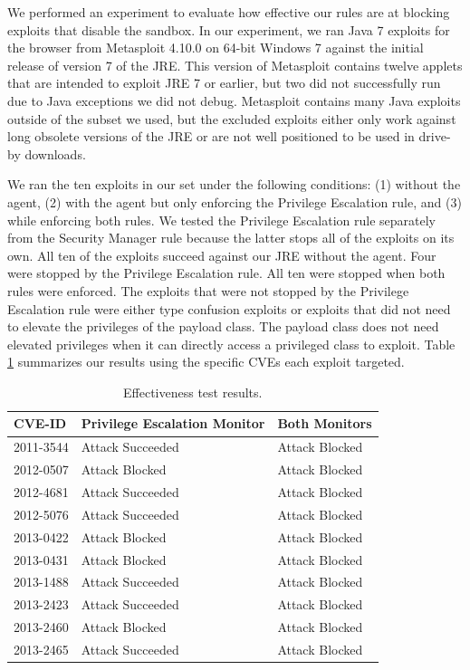\documentclass{sig-alternate}
\begin{document}

We performed an experiment to evaluate how effective our rules are
at blocking exploits that disable the sandbox. In our experiment,
we ran Java 7 exploits for the browser from Metasploit 4.10.0 on 64-bit
Windows 7 against the initial release of version 7 of the JRE. This
version of Metasploit contains twelve applets that are intended to
exploit JRE 7 or earlier, but two did not successfully run due to
Java exceptions we did not debug. Metasploit contains many Java exploits
outside of the subset we used, but the excluded exploits either only
work against long obsolete versions of the JRE or are not well positioned
to be used in drive-by downloads. 

We ran the ten exploits in our set under the following conditions:
(1) without the agent, (2) with the agent but only enforcing the Privilege
Escalation rule, and (3) while enforcing both rules. We tested the Privilege Escalation rule separately from the Security Manager rule because the latter stops all of the exploits on its own. All
ten of the exploits succeed against our JRE without the agent. Four
were stopped by the Privilege Escalation rule. All ten were stopped
when both rules were enforced. The exploits that were not stopped
by the Privilege Escalation rule were either type confusion exploits
or exploits that did not need to elevate the privileges of the payload
class. The payload class does not need elevated privileges when it
can directly access a privileged class to exploit. Table \ref{tab:Exploit-experiment-summary}
summarizes our results using the specific CVEs each exploit targeted.

\begin{table}
\caption{Effectiveness test results.}\label{tab:Exploit-experiment-summary}
\begin{tabular}{l>{\raggedright}p{3cm}l}
\toprule 
\textbf{CVE-ID} & \textbf{Privilege Escalation Monitor} & \textbf{Both Monitors}\tabularnewline
\midrule
2011-3544 & Attack Succeeded  & Attack Blocked\tabularnewline
2012-0507 & Attack Blocked & Attack Blocked\tabularnewline
2012-4681 & Attack Succeeded  & Attack Blocked\tabularnewline
2012-5076 & Attack Succeeded  & Attack Blocked\tabularnewline
2013-0422 & Attack Blocked & Attack Blocked\tabularnewline
2013-0431 & Attack Blocked & Attack Blocked\tabularnewline
2013-1488 & Attack Succeeded  & Attack Blocked\tabularnewline
2013-2423 & Attack Succeeded  & Attack Blocked\tabularnewline
2013-2460 & Attack Blocked & Attack Blocked\tabularnewline
2013-2465 & Attack Succeeded  & Attack Blocked\tabularnewline
\bottomrule
\end{tabular}
\end{table}
\end{document}
